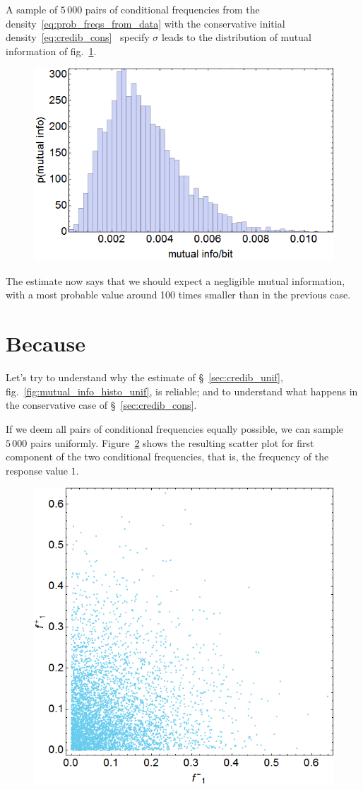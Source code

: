 \documentclass[\ifafour a4paper,12pt,\else a5paper,10pt,\fi%
onecolumn,oneside,article,%
british%
]{memoir}
\theoremstyle{remark}
\theoremstyle{innote}
\renewcommand*{\|}{\nonscript\,\vert\nonscript\;\mathopen{}}
\newcommand*{\sect}{\S}%
\newcommand*{\fig}{fig.}%
\newcommand*{\puzzle}{{\fontencoding{U}\fontfamily{fontawesometwo}\selectfont\symbol{225}}}
\newcommand{\mynote}[1]{ {\color{notecolour}\puzzle\ #1}}
\begin{document}
A sample of $5\,000$ pairs of conditional frequencies from the
density~\eqref{eq:prob_freqs_from_data} with the conservative initial
density~\eqref{eq:credib_cons} \mynote{specify $\sigma$} leads to the
distribution of mutual information of
\fig~\ref{fig:mutual_info_histo_cons}.
\begin{figure}[h!]
\centering\includegraphics[width=0.5\linewidth]{B_mutualinfo_hist.png}\\
\caption{}\label{fig:mutual_info_histo_cons}
\end{figure}%
The estimate now says that we should
expect a negligible mutual information, with a most probable value around
100 times smaller than in the previous case.

\section{Because}
\label{sec:intuitive_understanding}

Let's try to understand why the estimate of \sect~\ref{sec:credib_unif},
\fig~\ref{fig:mutual_info_histo_unif}, is reliable; and to understand what
happens in the conservative case of \sect~\ref{sec:credib_cons}.

If we deem all pairs of conditional frequencies equally possible, we can
sample $5\,000$ pairs uniformly. Figure~\ref{fig:f1_unif} shows the
resulting scatter plot for first component of the two conditional
frequencies, that is, the frequency of the response value $1$.
\begin{figure}[h!]
\centering\includegraphics[width=0.5\linewidth]{A_sample_f1.png}\\
\caption{}\label{fig:f1_unif}
\end{figure}%
\end{document}
